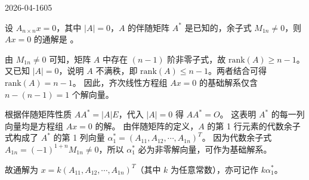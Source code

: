 \begin{mistake}{2026-04-16}{05}

\begin{problemcontent}
设 \(A_{n \times n}x = 0\)，其中 \(|A|=0\)，\(A\) 的伴随矩阵 \(A^*\) 是已知的，余子式 \(M_{1n} \neq 0\)，则 \(Ax=0\) 的通解是 \underline{\hspace{3cm}}。
\end{problemcontent}

\begin{solutioncontent}
由 \(M_{1n} \neq 0\) 可知，矩阵 \(A\) 中存在 \((n-1)\) 阶非零子式，故 \(\text{rank}(A) \ge n-1\)。
又已知 \(|A|=0\)，说明 \(A\) 不满秩，即 \(\text{rank}(A) \le n-1\)。两者结合可得 \(\text{rank}(A) = n-1\)。
因此，齐次线性方程组 \(Ax=0\) 的基础解系仅含 \(n - (n-1) = 1\) 个解向量。

根据伴随矩阵性质 \(AA^* = |A|E\)，代入 \(|A|=0\) 得 \(AA^* = O\)。
这表明 \(A^*\) 的每一列向量均是方程组 \(Ax=0\) 的解。
由伴随矩阵的定义，\(A\) 的第 1 行元素的代数余子式构成了 \(A^*\) 的第 1 列向量 \(\alpha_1^* = (A_{11}, A_{12}, \cdots, A_{1n})^T\)。
因为代数余子式 \(A_{1n} = (-1)^{1+n} M_{1n} \neq 0\)，所以 \(\alpha_1^*\) 必为非零解向量，可作为基础解系。

故通解为 \(x = k(A_{11}, A_{12}, \cdots, A_{1n})^T\)（其中 \(k\) 为任意常数），亦可记作 \(k\alpha_1^*\)。
\end{solutioncontent}


\end{mistake}
